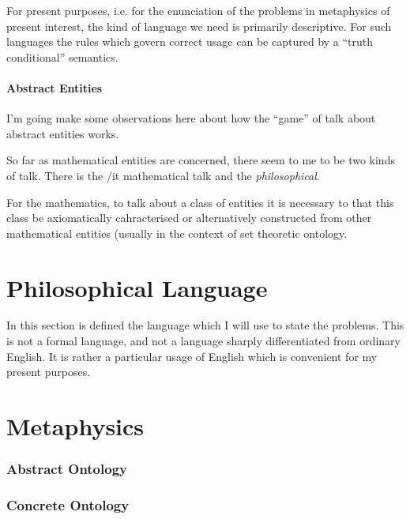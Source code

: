 \documentclass{rbjk}
\begin{document}
\begin{article}
For present purposes, i.e. for the enunciation of the problems in metaphysics of present interest, the kind of language we need is primarily descriptive.
For such languages the rules which govern correct usage can be captured by a ``truth conditional'' semantics.

\subsection{Abstract Entities}

I'm going make some observations here about how the ``game'' of talk about abstract entities works. 

So far as mathematical entities are concerned, there seem to me to be two kinds of talk.
There is the {/it mathematical} talk and the {\it philosophical}.

For the mathematics, to talk about a class of entities it is necessary to that this class be axiomatically cahracterised or alternatively constructed from other mathematical entities (usually in the context of set theoretic ontology.

\part{Philosophical Language}

In this section is defined the language which I will use to state the problems.
This is not a formal language, and not a language sharply differentiated from ordinary English.
It is rather a particular usage of English which is convenient for my present purposes.

\part{Metaphysics}

\section{Abstract Ontology}

\section{Concrete Ontology}

%
%

\end{article}
\end{document}

